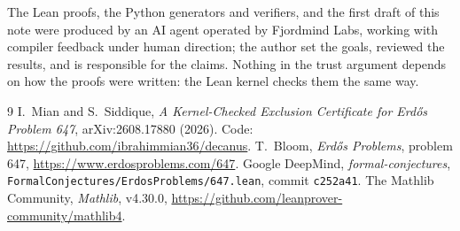 \documentclass[11pt]{article}
\begin{document}
The Lean proofs, the Python generators and verifiers, and the first draft of this note were produced by an AI agent operated by Fjordmind Labs, working with compiler feedback under human direction; the author set the goals, reviewed the results, and is responsible for the claims. Nothing in the trust argument depends on how the proofs were written: the Lean kernel checks them the same way.

\begin{thebibliography}{9}
 I.~Mian and S.~Siddique, \emph{A Kernel-Checked Exclusion Certificate for Erd\H{o}s Problem 647}, arXiv:2608.17880 (2026). Code: \url{https://github.com/ibrahimmian36/decanus}.
 T.~Bloom, \emph{Erd\H{o}s Problems}, problem 647, \url{https://www.erdosproblems.com/647}.
 Google DeepMind, \emph{formal-conjectures}, \texttt{FormalConjectures/ErdosProblems/647.lean}, commit \texttt{c252a41}.
 The Mathlib Community, \emph{Mathlib}, v4.30.0, \url{https://github.com/leanprover-community/mathlib4}.
\end{thebibliography}
\end{document}
